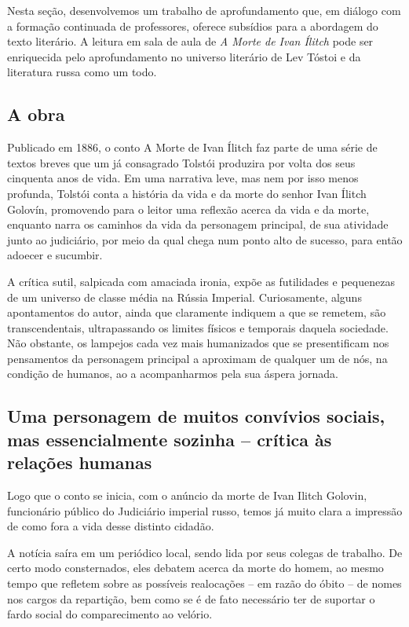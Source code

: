 \documentclass[12pt]{extarticle}
\begin{document}
Nesta seção, desenvolvemos um trabalho de aprofundamento que, em diálogo
com a formação continuada de professores, oferece subsídios para a
abordagem do texto literário. A leitura em sala de aula de \emph{A Morte
de Ivan Ílitch} pode ser enriquecida pelo aprofundamento no universo
literário de Lev Tóstoi e da literatura russa como um todo.

\subsection{A obra}

Publicado em 1886, o conto A Morte de Ivan Ílitch faz parte de uma série
de textos breves que um já consagrado Tolstói produzira por volta dos
seus cinquenta anos de vida. Em uma narrativa leve, mas nem por isso
menos profunda, Tolstói conta a história da vida e da morte do senhor
Ivan Ílitch Golovín, promovendo para o leitor uma reflexão acerca da
vida e da morte, enquanto narra os caminhos da vida da personagem
principal, de sua atividade junto ao judiciário, por meio da qual chega
num ponto alto de sucesso, para então adoecer e sucumbir.

A crítica sutil, salpicada com amaciada ironia, expõe as futilidades e
pequenezas de um universo de classe média na Rússia Imperial.
Curiosamente, alguns apontamentos do autor, ainda que claramente
indiquem a que se remetem, são transcendentais, ultrapassando os limites
físicos e temporais daquela sociedade. Não obstante, os lampejos cada
vez mais humanizados que se presentificam nos pensamentos da personagem
principal a aproximam de qualquer um de nós, na condição de humanos, ao
a acompanharmos pela sua áspera jornada.

\subsection{Uma personagem de muitos convívios sociais, mas essencialmente
sozinha -- crítica às relações humanas}

Logo que o conto se inicia, com o anúncio da morte de Ivan Ilitch
Golovin, funcionário público do Judiciário imperial russo, temos já
muito clara a impressão de como fora a vida desse distinto cidadão.

A notícia saíra em um periódico local, sendo lida por seus colegas de
trabalho. De certo modo consternados, eles debatem acerca da morte do
homem, ao mesmo tempo que refletem sobre as possíveis realocações -- em
razão do óbito -- de nomes nos cargos da repartição, bem como se é de
fato necessário ter de suportar o fardo social do comparecimento ao
velório.
\end{document}
